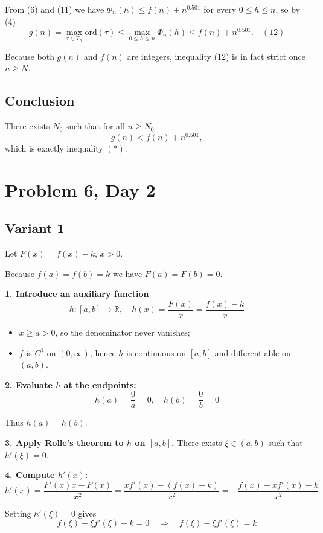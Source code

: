 \documentclass[12pt,a4paper]{article}
\theoremstyle{definition}
\begin{document}
        From (6) and (11) we have $\Phi_n(h) \leq f(n) + n^{0.501}$ for every $0 \leq h \leq n$, so by (4)
        $$g(n) = \max_{\tau \in T_n} \text{ord}(\tau) \leq \max_{0 \leq h \leq n} \Phi_n(h) \leq f(n) + n^{0.501}. \quad (12)$$

        Because both $g(n)$ and $f(n)$ are integers, inequality (12) is in fact strict once $n \geq N$.

        \subsection*{Conclusion}

        There exists $N_0$ such that for all $n \geq N_0$
        $$g(n) < f(n) + n^{0.501},$$
        which is exactly inequality $(*)$.


\section{Problem 6, Day 2}

\subsection{Variant 1}
Let $F(x) = f(x) - k$, $x > 0$.

Because $f(a) = f(b) = k$ we have $F(a) = F(b) = 0$.

\textbf{1. Introduce an auxiliary function}
$$h: [a,b] \to \mathbb{R}, \quad h(x) = \frac{F(x)}{x} = \frac{f(x) - k}{x}$$

\begin{itemize}
\item $x \geq a > 0$, so the denominator never vanishes;
\item $f$ is $C^1$ on $(0,\infty)$, hence $h$ is continuous on $[a,b]$ and differentiable on $(a,b)$.
\end{itemize}

\textbf{2. Evaluate $h$ at the endpoints:}
$$h(a) = \frac{0}{a} = 0, \quad h(b) = \frac{0}{b} = 0$$

Thus $h(a) = h(b)$.

\textbf{3. Apply Rolle's theorem to $h$ on $[a,b]$.}
There exists $\xi \in (a,b)$ such that $h'(\xi) = 0$.

\textbf{4. Compute $h'(x)$:}
$$h'(x) = \frac{F'(x)x - F(x)}{x^2} = \frac{xf'(x) - (f(x) - k)}{x^2} = -\frac{f(x) - xf'(x) - k}{x^2}$$

Setting $h'(\xi) = 0$ gives
$$f(\xi) - \xi f'(\xi) - k = 0 \quad \Rightarrow \quad f(\xi) - \xi f'(\xi) = k$$
\end{document}
